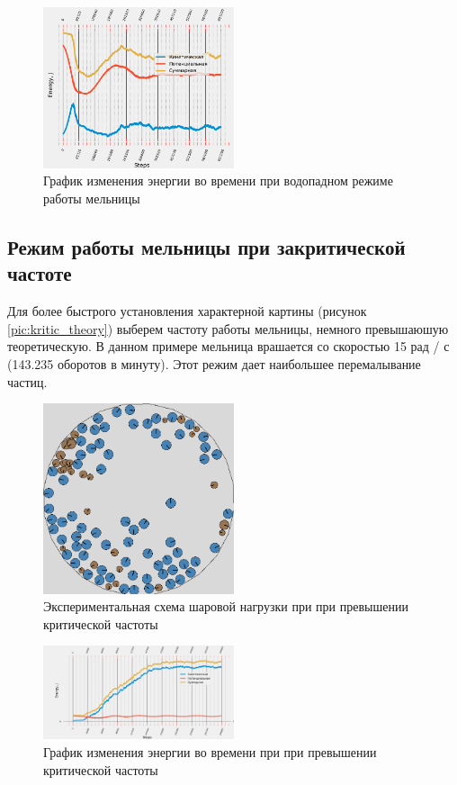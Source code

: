 \documentclass[utf8x, 14pt, oneside, a4paper]{article}
\begin{document}
\begin{figure}[H]
	\centering
	\includegraphics[width=0.5\textwidth]{vodopad_energy} 
	\caption{График изменения энергии во времени при водопадном режиме работы мельницы}
	\label{pic:vodopad_energy}
\end{figure} 


\subsection{Режим работы мельницы при закритической частоте}

Для более быстрого установления характерной картины (рисунок \ref{pic:kritic_theory}) выберем частоту работы мельницы, немного превышаюшую теоретическую.
В данном примере мельница врашается со скоростью 15 рад / с (143.235 оборотов в минуту).
Этот режим дает наибольшее перемалывание частиц.

\begin{figure}[H]
	\centering
	\includegraphics[width=0.5\textwidth]{kritic_result} 
	\caption{Экспериментальная схема шаровой нагрузки при при превышении критической частоты}
	\label{pic:kritic_result}
\end{figure} 

\begin{figure}[H]
	\centering
	\includegraphics[width=0.5\textwidth]{kritic_energy} 
	\caption{График изменения энергии во времени при при превышении критической частоты}
	\label{pic:kritic_energy}
\end{figure} 
\end{document}
